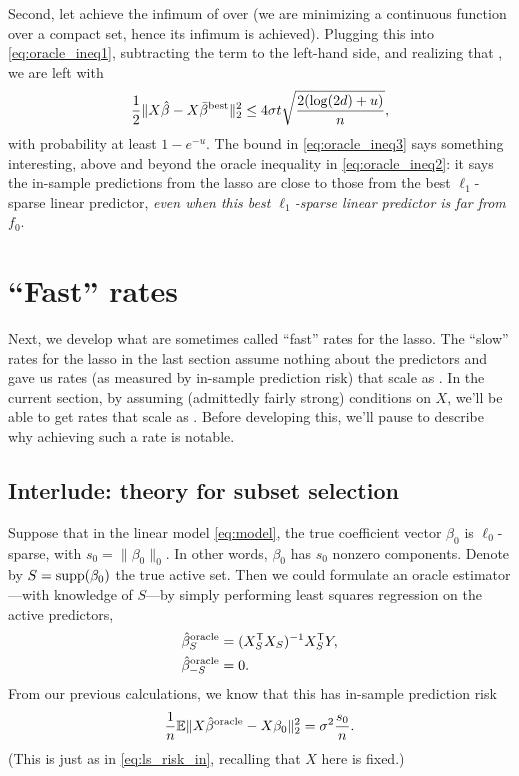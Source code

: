 \documentclass{article}
\begin{document}
Second, let  achieve the infimum of
 over  (we are minimizing a continuous function over a compact set, hence
its infimum is achieved). Plugging this into \eqref{eq:oracle_ineq1},
subtracting the term  to the left-hand side, and realizing that , we are left with    
\begin{equation}
\label{eq:oracle_ineq3}
\frac{1}{2} \|X\hat{\beta} - X\bar\beta^{\text{best}}\|_2^2 \leq 4 \sigma t
\sqrt{\frac{2 (\log(2d) + u)}{n}},    
\end{equation}
with probability at least $1-e^{-u}$. The bound in \eqref{eq:oracle_ineq3} says
something interesting, above and beyond the oracle inequality in
\eqref{eq:oracle_ineq2}: it says the in-sample predictions from the lasso are 
close to those from the best $\ell_1$-sparse linear predictor, \emph{even when
  this best $\ell_1$-sparse linear predictor is far from $f_0$}.    

\section{``Fast'' rates}

Next, we develop what are sometimes called ``fast'' rates for the lasso. The
``slow'' rates for the lasso in the last section assume nothing about the
predictors and gave us rates (as measured by in-sample prediction risk) that
scale as . In the current section, by assuming  
(admittedly fairly strong) conditions on $X$, we'll be able to get rates that
scale as . Before developing this, we'll pause to describe
why achieving such a rate is notable.  

\subsection{Interlude: theory for subset selection}

Suppose that in the linear model \eqref{eq:model}, the true coefficient vector 
$\beta_0$ is $\ell_0$-sparse, with $s_0 = \|\beta_0\|_0$. In other words,
$\beta_0$ has $s_0$ nonzero components. Denote by $S = \mathrm{supp}(\beta_0)$ the true
active set. Then we could formulate an oracle estimator---with knowledge of
$S$---by simply performing least squares regression on the active predictors, 
\begin{align*}
\hat{\beta}_S^{\text{oracle}} &= (X_S^{\mathsf{T}} X_S)^{-1} X_S^{\mathsf{T}} Y, \\
\hat{\beta}_{-S}^{\text{oracle}} &= 0.
\end{align*} 
From our previous calculations, we know that this has in-sample prediction risk 
\[
\frac{1}{n} \mathbb{E}\|X\hat{\beta}^{\text{oracle}} - X\beta_0\|_2^2 = \sigma^2
\frac{s_0}{n}.    
\]
(This is just as in \eqref{eq:ls_risk_in}, recalling that $X$ here is fixed.) 
\end{document}
